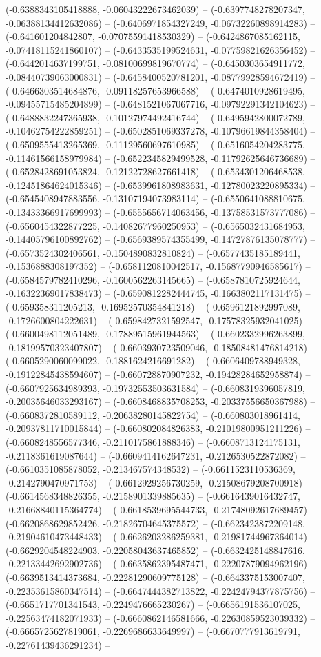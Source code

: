 (-0.6388343105418888, -0.06043222673462039) -- (-0.6397748278207347, -0.06388134412632086) -- (-0.6406971854327249, -0.06732260898914283) -- (-0.641601204842807, -0.07075591418530329) -- (-0.6424867085162115, -0.07418115241860107) -- (-0.6433535199524631, -0.07759821626356452) -- (-0.6442014637199751, -0.08100699819670774) -- (-0.6450303654911772, -0.08440739063000831) -- (-0.6458400520781201, -0.08779928594672419) -- (-0.6466303514684876, -0.09118257653966588) -- (-0.6474010928619495, -0.09455715485204899) -- (-0.6481521067067716, -0.09792291342104623) -- (-0.6488832247365938, -0.10127974492416744) -- (-0.6495942800072789, -0.10462754222859251) -- (-0.6502851069337278, -0.10796619844358404) -- (-0.6509555413265369, -0.11129560697610985) -- (-0.6516054204283775, -0.11461566158979984) -- (-0.6522345829499528, -0.11792625646736689) -- (-0.6528428691053824, -0.12122728627661418) -- (-0.6534301206468538, -0.12451864624015346) -- (-0.6539961808983631, -0.12780023220895334) -- (-0.6545408947883556, -0.13107194073983114) -- (-0.6550641088810675, -0.13433366917699993) -- (-0.6555656714063456, -0.13758531573777086) -- (-0.6560454322877225, -0.14082677960250953) -- (-0.6565032431684953, -0.14405796100892762) -- (-0.6569389574355499, -0.14727876135078777) -- (-0.6573524302406561, -0.1504890832810824) -- (-0.6577435185189441, -0.1536888308197352) -- (-0.6581120810042517, -0.15687790946585617) -- (-0.6584579782410296, -0.1600562263145665) -- (-0.6587810725924644, -0.16322369017838473) -- (-0.6590812282444745, -0.1663802117131475) -- (-0.659358311205213, -0.16952570354841218) -- (-0.6596121892997089, -0.1726600804222631) -- (-0.6598427321592547, -0.17578325932041025) -- (-0.6600498112051489, -0.17889515961944563) -- (-0.6602332996263899, -0.18199570323407807) -- (-0.6603930723509046, -0.18508481476814218) -- (-0.6605290060099022, -0.1881624216691282) -- (-0.6606409788949328, -0.19122845438594607) -- (-0.660728870907232, -0.19428284652958874) -- (-0.6607925634989393, -0.19732553503631584) -- (-0.6608319396057819, -0.20035646033293167) -- (-0.6608468835708253, -0.20337556650367988) -- (-0.6608372810589112, -0.20638280145822754) -- (-0.660803018961414, -0.20937811710015844) -- (-0.660802084826383, -0.21019800951211226) -- (-0.6608248556577346, -0.2110175861888346) -- (-0.6608713124175131, -0.2118361619087644) -- (-0.6609414162647231, -0.2126530522872082) -- (-0.6610351085878052, -0.213467574348532) -- (-0.6611523110536369, -0.2142790470971753) -- (-0.6612929256730259, -0.21508679208700918) -- (-0.6614568348826355, -0.2158901339885635) -- (-0.6616439016432747, -0.21668840115364774) -- (-0.6618539695544733, -0.21748092617689457) -- (-0.6620868629852426, -0.21826704645375572) -- (-0.6623423872209148, -0.21904610473448433) -- (-0.6626203286259381, -0.21981744967364014) -- (-0.6629204548224903, -0.22058043637465852) -- (-0.6632425148847616, -0.22133442692902736) -- (-0.6635862395487471, -0.22207879094962196) -- (-0.6639513414373684, -0.22281290609775128) -- (-0.6643375153007407, -0.22353615860347514) -- (-0.6647444382713822, -0.22424794377875756) -- (-0.6651717701341543, -0.2249476665230267) -- (-0.6656191536107025, -0.22563474182071933) -- (-0.6660862146581666, -0.22630859523039332) -- (-0.6665725627819061, -0.2269686633649997) -- (-0.6670777913619791, -0.22761439436291234) -- 